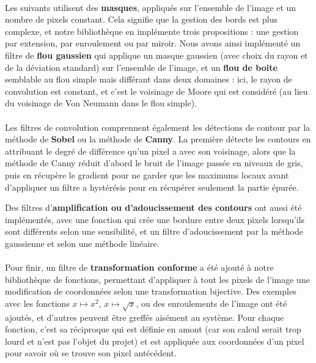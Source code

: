 \documentclass[a4paper]{article}
\begin{document}
\paragraph{}
Les suivants utilisent des \textbf{masques}, appliqués sur l'ensemble de l'image et un nombre de pixels constant. Cela signifie que la gestion des bords est plus complexe, et notre bibliothèque en implémente trois propositions : une gestion par extension, par enroulement ou par miroir. Nous avons ainsi implémenté un filtre de \textbf{flou gaussien} qui applique un masque gaussien (avec choix du rayon et de la déviation standard) sur l'ensemble de l'image, et un \textbf{flou de boite} semblable au flou simple mais différant dans deux domaines : ici, le rayon de convolution est constant, et c'est le voisinage de Moore qui est considéré (au lieu du voisinage de Von Neumann dans le flou simple).

\paragraph{}
Les filtres de convolution comprennent également les détections de contour par la méthode de \textbf{Sobel} ou la méthode de \textbf{Canny}. La première détecte les contours en attribuant le degré de différence qu'un pixel a avec son voisinage, alors que la méthode de Canny réduit d'abord le bruit de l'image passée en niveaux de gris, puis en récupère le gradient pour ne garder que les maximums locaux avant d'appliquer un filtre a hystérésis pour en récupérer seulement la partie épurée.

\textbf{}
Des filtres d'\textbf{amplification ou d'adoucissement des contours} ont aussi été implémentés, avec une fonction qui crée une bordure entre deux pixels lorsqu'ils sont différents selon une sensibilité, et un filtre d'adoucissement par la méthode gaussienne et selon une méthode linéaire.

\paragraph{}
Pour finir, un filtre de \textbf{transformation conforme} a été ajouté à notre bibliothèque de fonctions, permettant d'appliquer à tout les pixels de l'image une modification de coordonnées selon une transformation bijective. Des exemples avec les fonctions $x \mapsto x^2$, $x \mapsto \sqrt{x}$, ou des enroulements de l'image ont été ajoutés, et d'autres peuvent être greffés aisément au système. Pour chaque fonction, c'est sa réciproque qui est définie en amont (car son calcul serait trop lourd et n'est pas l'objet du projet) et est appliquée aux coordonnées d'un pixel pour savoir où se trouve son pixel antécédent.
\end{document}

